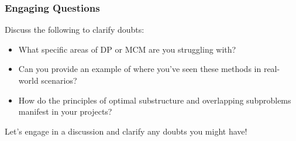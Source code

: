 \documentclass[aspectratio=169]{beamer}
\begin{document}
\begin{frame}[fragile]
    \frametitle{Engaging Questions}
    Discuss the following to clarify doubts:
    \begin{itemize}
        \item What specific areas of DP or MCM are you struggling with?
        \item Can you provide an example of where you've seen these methods in real-world scenarios?
        \item How do the principles of optimal substructure and overlapping subproblems manifest in your projects?
    \end{itemize}
    Let’s engage in a discussion and clarify any doubts you might have!
\end{frame}
\end{document}
